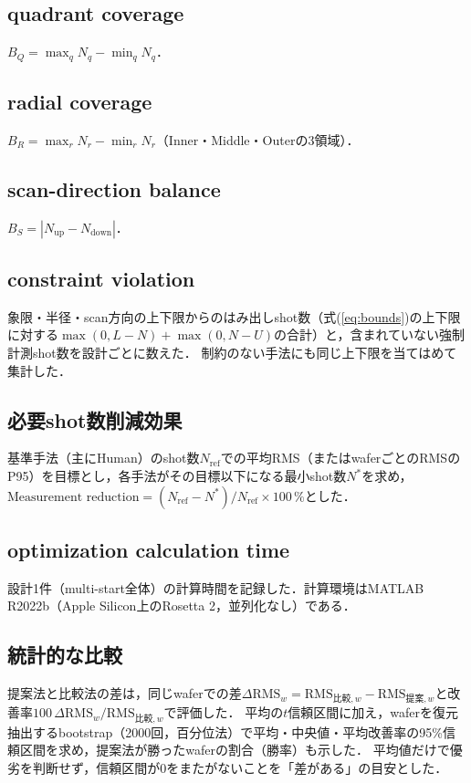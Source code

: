 \documentclass[10.5pt,a4paper]{ltjsarticle}
\begin{document}
\subsection{quadrant coverage}

$B_Q=\max_q N_q-\min_q N_q$．

\subsection{radial coverage}

$B_R=\max_r N_r-\min_r N_r$（Inner・Middle・Outerの3領域）．

\subsection{scan-direction balance}

$B_S=|N_\text{up}-N_\text{down}|$．

\subsection{constraint violation}

象限・半径・scan方向の上下限からのはみ出しshot数（式(\ref{eq:bounds})の上下限に対する$\max(0,L-N)+\max(0,N-U)$の合計）と，含まれていない強制計測shot数を設計ごとに数えた．
制約のない手法にも同じ上下限を当てはめて集計した．

\subsection{必要shot数削減効果}

基準手法（主にHuman）のshot数$N_\text{ref}$での平均RMS（またはwaferごとのRMSのP95）を目標とし，各手法がその目標以下になる最小shot数$N^*$を求め，$\text{Measurement reduction}=(N_\text{ref}-N^*)/N_\text{ref}\times100\,\%$とした．

\subsection{optimization calculation time}

設計1件（multi-start全体）の計算時間を記録した．計算環境はMATLAB R2022b（Apple Silicon上のRosetta 2，並列化なし）である．

\subsection*{統計的な比較}

提案法と比較法の差は，同じwaferでの差$\Delta\mathrm{RMS}_w=\mathrm{RMS}_{\text{比較},w}-\mathrm{RMS}_{\text{提案},w}$と改善率$100\,\Delta\mathrm{RMS}_w/\mathrm{RMS}_{\text{比較},w}$で評価した．
平均の$t$信頼区間に加え，waferを復元抽出するbootstrap（2000回，百分位法）\cite{efron1993}で平均・中央値・平均改善率の95\%信頼区間を求め，提案法が勝ったwaferの割合（勝率）も示した．
平均値だけで優劣を判断せず，信頼区間が0をまたがないことを「差がある」の目安とした．
\end{document}
